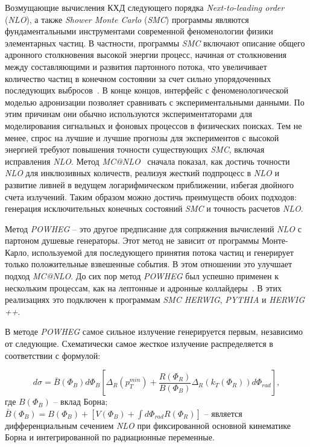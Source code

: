 Возмущающие вычисления КХД следующего порядка \textit{Next-to-leading order} (\textit{NLO}), а также \textit{Shower Monte Carlo}
(\textit{SMC}) программы являются фундаментальными инструментами современной феноменологии физики элементарных частиц. В частности, программы \textit{SMC} включают описание общего адронного столкновения высокой энергии
процесс, начиная от столкновения между составляющими и развития партонного потока, что
увеличивает количество частиц в конечном состоянии за счет сильно упорядоченных последующих выбросов~\cite{review-powheg}.
В конце концов, интерфейс с феноменологической моделью адронизации позволяет сравнивать
с экспериментальными данными. По этим причинам они обычно используются экспериментаторами для
моделирования сигнальных и фоновых процессов в физических поисках. Тем не менее, спрос на
лучшие и лучшие прогнозы для экспериментов с высокой энергией требуют повышения точности
существующих \textit{SMC}, включая исправления \textit{NLO}. Метод \textit{MC@NLO}~\cite{review-powheg} сначала показал, как
достичь точности \textit{NLO} для инклюзивных количеств, реализуя жесткий подпроцесс в \textit{NLO} и
развитие ливней в ведущем логарифмическом приближении, избегая двойного счета
излучений. Таким образом можно достичь преимуществ обоих подходов: генерация исключительных конечных состояний
\textit{SMC} и точность расчетов \textit{NLO}.

Метод \textit{POWHEG} -- это другое предписание для сопряжения вычислений \textit{NLO} с партоном
душевые генераторы.
Этот метод не зависит от программы Монте-Карло, используемой для последующего принятия потока частиц и
генерирует только положительные взвешенные события. В этом отношении это улучшает подход \textit{MC@NLO}.
До сих пор метод \textit{POWHEG} был успешно применен к нескольким процессам, как на
лептонные и адронные коллайдеры~\cite{review-powheg}. В этих реализациях это
подключен к программам \textit{SMC HERWIG}, \textit{PYTHIA} и \textit{HERWIG ++}.

В методе \textit{POWHEG} самое сильное излучение
генерируется первым, независимо от
следующие. Схематически
самое жесткое излучение распределяется в соответствии с формулой:

\begin{equation} \label{eq:1-1} 
	d\sigma = \bar{B} ({\Phi}_{B}) d{\Phi}_{B}[{\Delta}_{R}({p}_{T}^{min}) + \frac{R({\Phi}_{R})}{B({\Phi}_{B})}{\Delta}_{R}({k}_{T}({\Phi}_{R}))d{\Phi}_{rad}],
\end{equation}
где $B({\Phi}_{B})$ -- вклад Борна;\\
$\bar{B}({\Phi}_{B}) = B({\Phi}_{B}) + [V({\Phi}_{B}) + \int d{\Phi}_{rad}R({\Phi}_{R})]$ -- является дифференциальным сечением \textit{NLO} при фиксированной основной кинематике Борна и интегрированной по
радиационные переменные.

